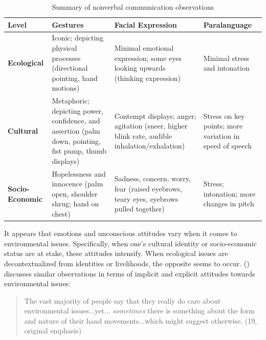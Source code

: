 \begin{table}[H]
\centering
\begin{footnotesize}

\begin{tabular}{ | P{3cm} | P{3cm}| P{3cm} | P{3cm}| }  
\hline
\textbf{Level}          & \textbf{Gestures} & \textbf{Facial Expression} & \textbf{Paralanguage} \\ \hline
\textbf{Ecological}     &  Iconic; depicting physical processes (directional pointing, hand motions)                & Minimal emotional expression; some eyes looking upwards (thinking expression)                           & Minimal stress and intonation                      \\ \hline
\textbf{Cultural}       & Metaphoric; depicting power, confidence, and assertion (palm down, pointing, fist pump, thumb displays)                 &    Contempt displays; anger; agitation (sneer, higher blink rate, audible inhalation/exhalation)                         &  Stress on key points; more variation in speed of speech                     \\ \hline
\textbf{Socio-Economic} &  Hopelessness and innocence (palm open, shoulder shrug; hand on chest)                &     Sadness, concern, worry, fear (raised eyebrows, teary eyes, eyebrows pulled together)                        & Stress; intonation; more changes in pitch                       \\ \hline
\end{tabular}
\caption{Summary of nonverbal communication observations}
\label{tab:my-table}
\end{footnotesize}
\end{table}

It appears that emotions and unconscious attitudes vary when it comes to environmental issues. Specifically, when one's cultural identity or socio-economic status are at stake, these attitudes intensify. When ecological issues are decontextualized from identities or livelihoods, the opposite seems to occur. \citeauthor{Beattie2016} (\citeyear{Beattie2016}) discusses similar observations in terms of implicit and explicit attitudes towards environmental issues:  

\begin{quote}
    The vast majority of people say that they really do care about environmental issues...yet... \textit{sometimes} there is something about the form and nature of their hand movements...which might suggest otherwise. (19, original emphasis)
\end{quote}

